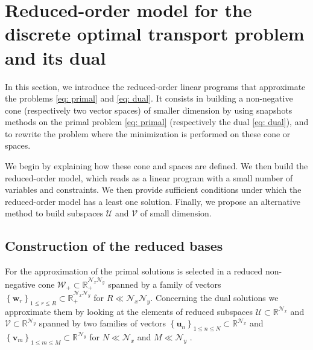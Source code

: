 \documentclass{article}
\def\RR{\mathbb{R}}
\def\cN{\mathcal{N}}
\def\cU{\mathcal{U}}
\def\cV{\mathcal{V}}
\def\cW{\mathcal{W}}
\def\uu{\mathbf{u}}
\def\vv{\mathbf{v}}
\def\ww{\mathbf{w}}
\begin{document}
\section{Reduced-order model for the discrete optimal transport problem and its dual}\label{section: RP}
%
In this section, we introduce  the reduced-order linear 
programs that approximate the problems \eqref{eq: primal} and 
\eqref{eq: dual}.  It consists in building a non-negative cone 
(respectively two vector spaces) of smaller dimension by using 
snapshots methods on the primal problem \eqref{eq: primal} 
(respectively the dual \eqref{eq: dual}), and to rewrite the 
problem where the minimization is performed on these cone or spaces.

We begin by explaining how these cone and spaces are defined. We 
then build the reduced-order model, which reads as a linear program 
with a small number of variables and constraints.
We then provide sufficient conditions under which the reduced-order model has a least one solution. Finally, we propose an 
alternative method to build subspaces $\cU$ and $\cV$ of small 
dimension. 

\subsection{Construction of the reduced bases}
%
For the approximation of the primal solutions is selected in a reduced non-negative cone $\mathcal{W}_+ \subset \RR_+^{\cN_x \cN_y}
$ spanned by a family of vectors $\left\lbrace \ww_r \right\rbrace_{1 \leq r \leq R} \subset \RR_+^{\cN_x \cN_y}$ for $R \ll \cN_x  \cN_y$. Concerning  the dual solutions we approximate them by looking at the elements of reduced subspaces $\mathcal{U} \subset \RR^{\cN_x}$ and $\mathcal{V} \subset \RR^{\cN_y}$ spanned by two families of vectors $\left\lbrace \uu_n \right\rbrace_{1 \leq n \leq N} \subset \RR^{\cN_x}$  and  $\left\lbrace \vv_m \right\rbrace_{1 \leq m \leq M} \subset \RR^{\cN_y}$ for $N \ll \cN_x $ and $M \ll \cN_y$ .
\end{document}
